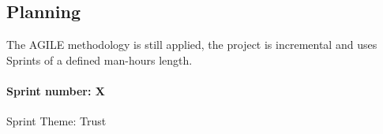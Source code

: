 
\subsection{Planning}
The AGILE methodology is still applied, the project is incremental and uses Sprints of a defined man-hours length.

\paragraph{Sprint number: X}
Sprint Theme: Trust
